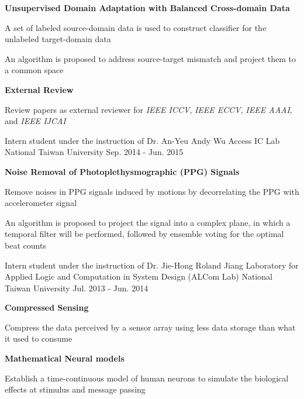 \documentclass[12pt, a4paper]{awesome-cv}
\begin{document}
\begin{cventries}
{\begin{cvitems}
\begin{cvitems}
            \end{cvitems}
        \item{\bfseries Unsupervised Domain Adaptation with Balanced Cross-domain Data}
            \begin{cvitems}
            \item{A set of labeled source-domain data is used to construct classifier for the unlabeled target-domain data}
            \item{An algorithm is proposed to address source-target mismatch and project them to a common space}
            \end{cvitems}
        \item{\bfseries External Review}
            \begin{cvitems}
            \item{Review papers as external reviewer for \emph{IEEE ICCV}, \emph{IEEE ECCV}, \emph{IEEE AAAI}, and \emph{IEEE IJCAI}}
            \end{cvitems}
        \end{cvitems}
    }
    \cventry
    {Intern student under the instruction of Dr. An-Yeu Andy Wu}
    {Access IC Lab}
    {National Taiwan University}
    {Sep. 2014 - Jun. 2015}
    {
        \begin{cvitems}
        \item{\bfseries Noise Removal of Photoplethysmographic (PPG) Signals}
            \begin{cvitems}
            \item{Remove noises in PPG signals induced by motions by decorrelating the PPG with accelerometer signal}
            \item{An algorithm is proposed to project the signal into a complex plane, in which a temporal filter will be performed, followed by ensemble voting for the optimal beat counts}
            \end{cvitems}
        \end{cvitems}
    }
    \cventry
    {Intern student under the instruction of Dr. Jie-Hong Roland Jiang}
    {Laboratory for Applied Logic and Computation in System Design (ALCom Lab)}
    {National Taiwan University}
    {Jul. 2013 - Jun. 2014}
    {
        \begin{cvitems}
        \item{\bfseries Compressed Sensing}
            \begin{cvitems}
            \item{Compress the data perceived by a sensor array using less data storage than what it used to consume}
            \end{cvitems}
        \item{\bfseries Mathematical Neural models}
            \begin{cvitems}
            \item{Establish a time-continuous model of human neurons to simulate the biological effects at stimulus and message passing}
            \end{cvitems}
        \end{cvitems}
    }
\end{cventries}
\vspace{-5mm}
\end{document}
